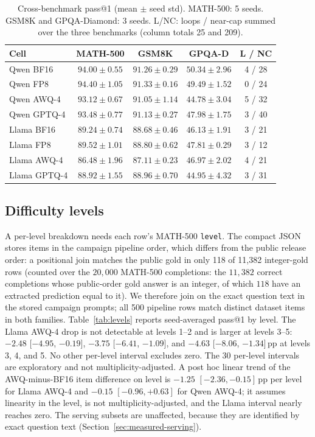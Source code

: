 \documentclass[11pt,a4paper]{article}
\begin{document}
\begin{table}[t]
\centering
\caption{Cross-benchmark pass@1 (mean $\pm$ seed std). MATH-500: 5 seeds. GSM8K and GPQA-Diamond: 3 seeds. L/NC: loops / near-cap summed over the three benchmarks (column totals 25 and 209).}
\label{tab:multitask}
\small
\begin{tabular}{lcccc}
\toprule
\textbf{Cell} & \textbf{MATH-500} & \textbf{GSM8K} & \textbf{GPQA-D} & \textbf{L / NC} \\
\midrule
Qwen BF16   & $94.00\pm0.55$ & $91.26\pm0.29$ & $50.34\pm2.96$ & 4 / 28 \\
Qwen FP8    & $94.40\pm1.05$ & $91.33\pm0.16$ & $49.49\pm1.52$ & 0 / 24 \\
Qwen AWQ-4  & $93.12\pm0.67$ & $91.05\pm1.14$ & $44.78\pm3.04$ & 5 / 32 \\
Qwen GPTQ-4 & $93.48\pm0.77$ & $91.13\pm0.27$ & $47.98\pm1.75$ & 3 / 40 \\
\midrule
Llama BF16   & $89.24\pm0.74$ & $88.68\pm0.46$ & $46.13\pm1.91$ & 3 / 21 \\
Llama FP8    & $89.52\pm1.01$ & $88.80\pm0.62$ & $47.81\pm0.29$ & 3 / 12 \\
Llama AWQ-4  & $86.48\pm1.96$ & $87.11\pm0.23$ & $46.97\pm2.02$ & 4 / 21 \\
Llama GPTQ-4 & $88.92\pm1.55$ & $88.96\pm0.70$ & $44.95\pm4.32$ & 3 / 31 \\
\bottomrule
\end{tabular}
\end{table}


\subsection{Difficulty levels}
A per-level breakdown needs each row's MATH-500 \texttt{level}. The compact JSON stores items in the campaign pipeline order, which differs from the public release order: a positional join matches the public gold in only 118 of 11{,}382 integer-gold rows (counted over the $20{,}000$ MATH-500 completions: the $11{,}382$ correct completions whose public-order gold answer is an integer, of which $118$ have an extracted prediction equal to it). We therefore join on the exact question text in the stored campaign prompts; all 500 pipeline rows match distinct dataset items in both families. Table~\ref{tab:levels} reports seed-averaged pass@1 by level. The Llama AWQ-4 drop is not detectable at levels 1--2 and is larger at levels 3--5: $-2.48$ [$-4.95$, $-0.19$], $-3.75$ [$-6.41$, $-1.09$], and $-4.63$ [$-8.06$, $-1.34$]\,pp at levels 3, 4, and 5. No other per-level interval excludes zero. The 30 per-level intervals are exploratory and not multiplicity-adjusted. A post hoc linear trend of the AWQ-minus-BF16 item difference on level is $-1.25$ $[-2.36,-0.15]$\,pp per level for Llama AWQ-4 and $-0.15$ $[-0.96,+0.63]$ for Qwen AWQ-4; it assumes linearity in the level, is not multiplicity-adjusted, and the Llama interval nearly reaches zero. The serving subsets are unaffected, because they are identified by exact question text (Section~\ref{sec:measured-serving}).
\end{document}
